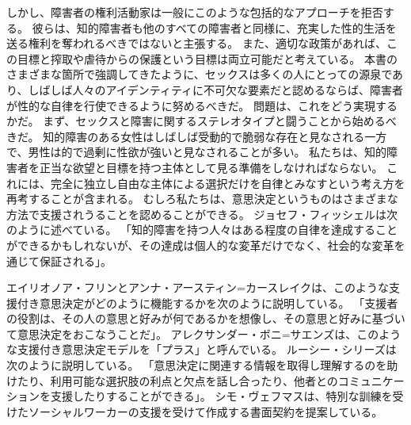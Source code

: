 \documentclass[paper=a4,book,openany]{jlreq}
\begin{document}
しかし、障害者の権利活動家は一般にこのような包括的なアプローチを拒否する。
彼らは、知的障害者も他のすべての障害者と同様に、充実した性的生活を送る権利を奪われるべきではないと主張する。
また、適切な政策があれば、この目標と搾取や虐待からの保護という目標は両立可能だと考えている。
本書のさまざまな箇所で強調してきたように、セックスは多くの人にとっての源泉であり、しばしば人々のアイデンティティに不可欠な要素だと認めるならば、障害者が性的な自律を行使できるように努めるべきだ\citep{vehmas19:_person_profoun_intel_disab_their_right_sex,hollomotz10:_vulner_adult,evans09:_sexual_person_relat_peopl_intel_disab,kittay10:_person_is_philos_is_polit}。
問題は、これをどう実現するかだ。
まず、セックスと障害に関するステレオタイプと闘うことから始めるべきだ。
知的障害のある女性はしばしば受動的で脆弱な存在と見なされる一方で、男性は的で過剰に性欲が強いと見なされることが多い\citep{feely16:_sexual_surveil_contr_commun_based,gill15:_alread_doing_it,barrett14:_disab_mascul}。
私たちは、知的障害者を正当な欲望と目標を持つ主体として見る準備をしなければならない。
これには、完全に独立し自由な主体による選択だけを自律とみなすという考え方を再考することが含まれる。
むしろ私たちは、意思決定というものはさまざまな方法で支援されうることを認めることができる。
ジョセフ・フィッシェルは次のように述べている。
「知的障害を持つ人々はある程度の自律を達成することができるかもしれないが、その達成は個人的な変革だけでなく、社会的な変革を通じて保証される」\citep[p.146]{fischel18:screwconsent}。

エイリオノア・フリンとアンナ・アースティン=カースレイクは、このような支援付き意思決定がどのように機能するかを次のように説明している。
「支援者の役割は、その人の意思と好みが何であるかを想像し、その意思と好みに基づいて意思決定をおこなうことだ」\citep[pp.81--104]{flynn14:_legis_person}。
アレクサンダー・ボニ=サエンズは、このような支援付き意思決定モデルを「プラス」と呼んでいる\citep[p.1234]{boni-saenz15:_sexual_incap}。
ルーシー・シリーズは次のように説明している。
「意思決定に関連する情報を取得し理解するのを助けたり、利用可能な選択肢の利点と欠点を話し合ったり、他者とのコミュニケーションを支援したりすることができる」\citep{series15:_relat_auton_legal_capac}。
シモ・ヴェフマスは、特別な訓練を受けたソーシャルワーカーの支援を受けて作成する書面契約を提案している\citep[p.527]{vehmas19:_person_profoun_intel_disab_their_right_sex}。
\end{document}
